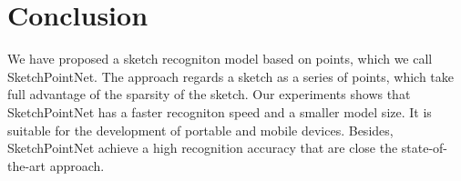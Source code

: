 \section{Conclusion}
\label{sec:conclusion}

We have proposed a sketch recogniton model based on points, which we call SketchPointNet. The approach regards a sketch as a series of points, which take full advantage of the sparsity of the sketch. Our experiments shows that SketchPointNet has a faster recogniton speed and a smaller model size. It is suitable for the development of portable and mobile devices. Besides, SketchPointNet achieve a high recognition accuracy that are close the state-of-the-art approach. 